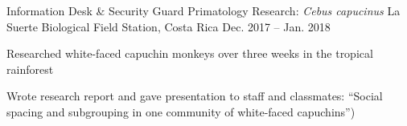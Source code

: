 

\begin{cventries}

  \cventry
    {Information Desk \& Security Guard} %
    {Primatology Research: \textit{Cebus capucinus}} %
    {La Suerte Biological Field Station, Costa Rica} %
    {Dec. 2017 -- Jan. 2018} %
    {
      \begin{cvitems} %
        \item {Researched white-faced capuchin monkeys over three weeks in the tropical rainforest}
        \item {Wrote research report and gave presentation to staff and classmates: ``Social spacing and subgrouping in one community of white-faced capuchins'')}
      \end{cvitems}
    }

\end{cventries}